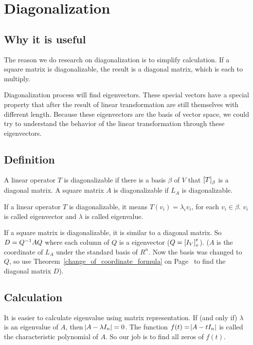 \section{Diagonalization}

\subsection{Why it is useful}


The reason we do research on diagonalization is to simplify calculation. If a square matrix is diagonalizable, the result is a diagonal matrix, which is each to multiply.

Diagonalization process will find eigenvectors. These special vectors have a special property that after the result of linear transformation are still themselves with different length. Because these eigenvectors are the basis of vector space, we could try to understand the behavior of the linear transformation through these eigenvectors.

\subsection{Definition}


A linear operator $T$ is diagonalizable if there is a basis $\beta$ of $V$ that $\coordinate{T}_\beta$ is a diagonal matrix. A square matrix $A$ is diagonalizable if $L_A$ is diagonalizable.

If a linear operator $T$ is diagonalizable, it means $T(v_i) = \lambda_i v_i$, for each $v_i \in \beta$. $v_i$ is called eigenvector and $\lambda$ is called eigenvalue.

If a square matrix is diagonalizable, it is similar to a diagonal matrix. So $D = {Q}^{-1} A Q$ where each column of $Q$ is a eigenvector ($Q = \coordinate{I_V}_v^e$). ($A$ is the coordinate of $L_A$ under the standard basis of $R^n$. Now the basis was changed to $Q$, so use Theorem~\ref{change_of_coordinate_formula} on Page~\pageref{change_of_coordinate_formula} to find the diagonal matrix $D$).



\subsection{Calculation}

It is easier to calculate eigenvalue using matrix representation. If (and only if) $\lambda$ is an eigenvalue of $A$, then $\abs{A - \lambda I_n} = 0$. The function $f(t) = \abs{A - t I_n}$ is called the characteristic polynomial of $A$. So our job is to find all zeros of $f(t)$.


